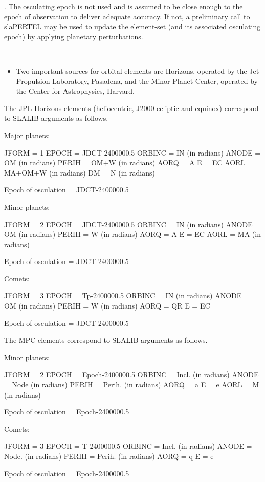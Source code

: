 \documentclass[twoside,11pt]{article}
\renewcommand{\_}{\texttt{\symbol{95}}}
\newcommand{\sstitemlist}[1]{
  \mbox{} \\
  \vspace{-3.5ex}
  \begin{itemize}
     #1
  \end{itemize}
}
\newcommand{\sstitem}{\item}
\newcommand{\sstitemlist}[1]{
      \begin{itemize}
         #1
      \end{itemize}
      \\
   }
\newcommand{\sstitem}{\item}
\begin{document}
{{        . The osculating epoch is not used and is assumed to be close
          enough to the epoch of observation to deliver adequate accuracy.
          If not, a preliminary call to sla\_PERTEL may be used to update
          the element-set (and its associated osculating epoch) by
          applying planetary perturbations.
      \sstitemlist{

         \sstitem
         Two important sources for orbital elements are Horizons, operated
           by the Jet Propulsion Laboratory, Pasadena, and the Minor Planet
           Center, operated by the Center for Astrophysics, Harvard.

      }
        The JPL Horizons elements (heliocentric, J2000 ecliptic and
        equinox) correspond to SLALIB arguments as follows.

         Major planets:

          JFORM  = 1
          EPOCH  = JDCT-2400000.5
          ORBINC = IN (in radians)
          ANODE  = OM (in radians)
          PERIH  = OM$+$W (in radians)
          AORQ   = A
          E      = EC
          AORL   = MA$+$OM$+$W (in radians)
          DM     = N (in radians)

          Epoch of osculation = JDCT-2400000.5

         Minor planets:

          JFORM  = 2
          EPOCH  = JDCT-2400000.5
          ORBINC = IN (in radians)
          ANODE  = OM (in radians)
          PERIH  = W (in radians)
          AORQ   = A
          E      = EC
          AORL   = MA (in radians)

          Epoch of osculation = JDCT-2400000.5

         Comets:

          JFORM  = 3
          EPOCH  = Tp-2400000.5
          ORBINC = IN (in radians)
          ANODE  = OM (in radians)
          PERIH  = W (in radians)
          AORQ   = QR
          E      = EC

          Epoch of osculation = JDCT-2400000.5

       The MPC elements correspond to SLALIB arguments as follows.

         Minor planets:

          JFORM  = 2
          EPOCH  = Epoch-2400000.5
          ORBINC = Incl. (in radians)
          ANODE  = Node (in radians)
          PERIH  = Perih. (in radians)
          AORQ   = a
          E      = e
          AORL   = M (in radians)

          Epoch of osculation = Epoch-2400000.5

        Comets:

          JFORM  = 3
          EPOCH  = T-2400000.5
          ORBINC = Incl. (in radians)
          ANODE  = Node. (in radians)
          PERIH  = Perih. (in radians)
          AORQ   = q
          E      = e

          Epoch of osculation = Epoch-2400000.5
   }
}
\end{document}

